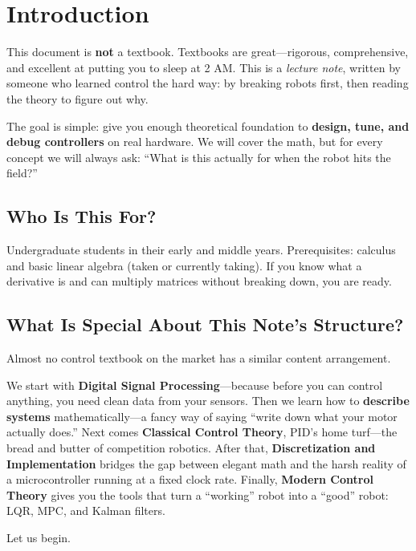 \section{Introduction}

This document is \textbf{not} a textbook. Textbooks are great---rigorous, comprehensive, and excellent at putting you to sleep at 2 AM. This is a \textit{lecture note}, written by someone who learned control the hard way: by breaking robots first, then reading the theory to figure out why.

The goal is simple: give you enough theoretical foundation to \textbf{design, tune, and debug controllers} on real hardware. We will cover the math, but for every concept we will always ask: ``What is this actually for when the robot hits the field?''

\subsection*{Who Is This For?}

Undergraduate students in their early and middle years. Prerequisites: calculus and basic linear algebra (taken or currently taking). If you know what a derivative is and can multiply matrices without breaking down, you are ready.

\subsection*{What Is Special About This Note's Structure?}

Almost no control textbook on the market has a similar content arrangement.

We start with \textbf{Digital Signal Processing}---because before you can control anything, you need clean data from your sensors. Then we learn how to \textbf{describe systems} mathematically---a fancy way of saying ``write down what your motor actually does.'' Next comes \textbf{Classical Control Theory}, PID's home turf---the bread and butter of competition robotics. After that, \textbf{Discretization and Implementation} bridges the gap between elegant math and the harsh reality of a microcontroller running at a fixed clock rate. Finally, \textbf{Modern Control Theory} gives you the tools that turn a ``working'' robot into a ``good'' robot: LQR, MPC, and Kalman filters.

Let us begin.

